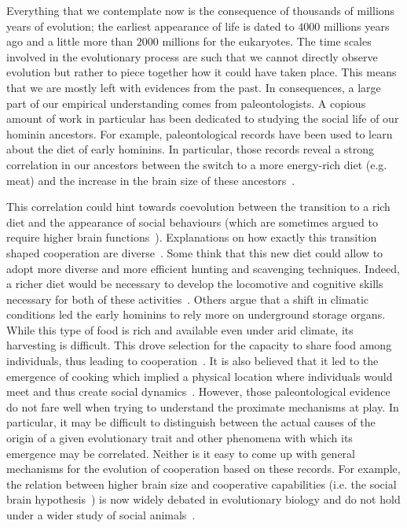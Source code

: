     Everything that we contemplate now is the consequence of thousands of millions years of evolution; the earliest appearance of life is dated to $4000$ millions years ago and a little more than $2000$ millions for the eukaryotes. The time scales involved in the evolutionary process are such that we cannot directly observe evolution but rather to piece together how it could have taken place. This means that we are mostly left with evidences from the past. In consequences, a large part of our empirical understanding comes from paleontologists. A copious amount of work in particular has been dedicated to studying the social life of our hominin ancestors. For example, paleontological records have been used to learn about the diet of early hominins. In particular, those records reveal a strong correlation in our ancestors between the switch to a more energy-rich diet (e.g. meat) and the increase in the brain size of these ancestors~\parencite{Aiello1995, Wrangham1999}.

    This correlation could hint towards coevolution between the transition to a rich diet and the appearance of social behaviours (which are sometimes argued to require higher brain functions~\parencite{Dunbar2007, Isler2012}). Explanations on how exactly this transition shaped cooperation are diverse~\parencite{Pontzer2012}. Some think that this new diet could allow to adopt more diverse and more efficient hunting and scavenging techniques. Indeed, a richer diet would be necessary to develop the locomotive and cognitive skills necessary for both of these activities~\parencite{Aiello1995, Bramble2004}. Others argue that a shift in climatic conditions led the early hominins to rely more on underground storage organs. While this type of food is rich and available even under arid climate, its harvesting is difficult. This drove selection for the capacity to share food among individuals, thus leading to cooperation~\parencite{OConnell2002}. It is also believed that it led to the emergence of cooking which implied a physical location where individuals would meet and thus create social dynamics~\parencite{Wrangham1999, Wrangham2009}. However, those paleontological evidence do not fare well when trying to understand the proximate mechanisms at play. In particular, it may be difficult to distinguish between the actual causes of the origin of a given evolutionary trait and other phenomena with which its emergence may be correlated. Neither is it easy to come up with general mechanisms for the evolution of cooperation based on these records. For example, the relation between higher brain size and cooperative capabilities (i.e. the social brain hypothesis~\parencite{Dunbar2007}) is now widely debated in evolutionary biology and do not hold under a wider study of social animals~\parencite{Finarelli2009}. 


